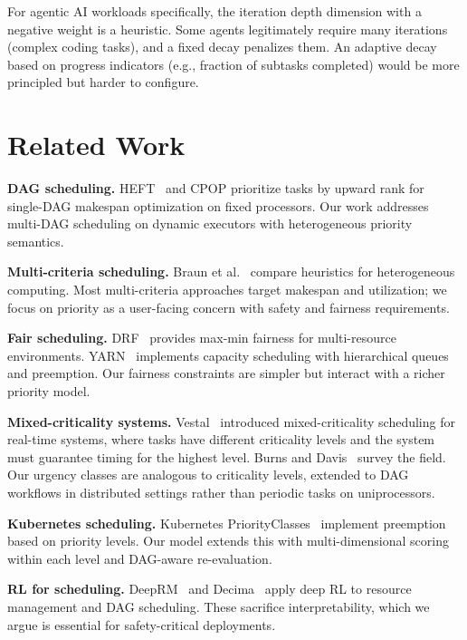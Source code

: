 \documentclass[conference]{IEEEtran}
\begin{document}
For agentic AI workloads specifically, the iteration depth dimension with a negative weight is a heuristic. Some agents legitimately require many iterations (complex coding tasks), and a fixed decay penalizes them. An adaptive decay based on progress indicators (e.g., fraction of subtasks completed) would be more principled but harder to configure.

\section{Related Work}
\label{sec:related}

\textbf{DAG scheduling.} HEFT~\cite{topcuoglu2002performance} and CPOP prioritize tasks by upward rank for single-DAG makespan optimization on fixed processors. Our work addresses multi-DAG scheduling on dynamic executors with heterogeneous priority semantics.

\textbf{Multi-criteria scheduling.} Braun et al.~\cite{braun2001comparison} compare heuristics for heterogeneous computing. Most multi-criteria approaches target makespan and utilization; we focus on priority as a user-facing concern with safety and fairness requirements.

\textbf{Fair scheduling.} DRF~\cite{ghodsi2011dominant} provides max-min fairness for multi-resource environments. YARN~\cite{vavilapalli2013yarn} implements capacity scheduling with hierarchical queues and preemption. Our fairness constraints are simpler but interact with a richer priority model.

\textbf{Mixed-criticality systems.} Vestal~\cite{vestal2007preemptive} introduced mixed-criticality scheduling for real-time systems, where tasks have different criticality levels and the system must guarantee timing for the highest level. Burns and Davis~\cite{burns2019mixed} survey the field. Our urgency classes are analogous to criticality levels, extended to DAG workflows in distributed settings rather than periodic tasks on uniprocessors.

\textbf{Kubernetes scheduling.} Kubernetes PriorityClasses~\cite{kubernetes2023priority} implement preemption based on priority levels. Our model extends this with multi-dimensional scoring within each level and DAG-aware re-evaluation.

\textbf{RL for scheduling.} DeepRM~\cite{mao2016resource} and Decima~\cite{mao2019learning} apply deep RL to resource management and DAG scheduling. These sacrifice interpretability, which we argue is essential for safety-critical deployments.
\end{document}
